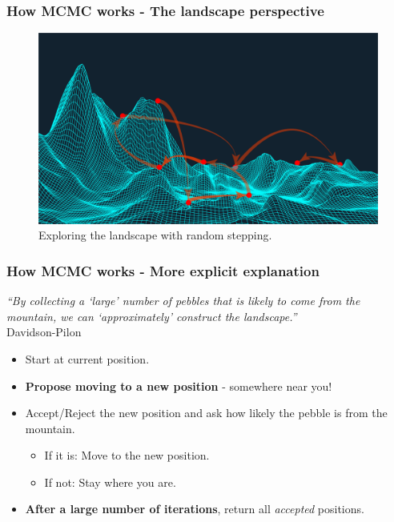 \documentclass[10pt]{beamer}
\begin{document}
\begin{frame}
	\frametitle{How MCMC works - The landscape perspective}
	\begin{figure}[h]
		\centering
		\includegraphics[width=\textwidth]{mountain}
		\caption{Exploring the landscape with random stepping.}
	\end{figure}
\end{frame} 

\begin{frame}
	\frametitle{How MCMC works - More explicit explanation}
	\begin{center}
		\textit{``By collecting a `large' number of pebbles that is likely to come from the mountain, we can `approximately' construct the landscape.''} \\
		\tiny{Davidson-Pilon} \normalsize
	\end{center}
	\begin{itemize}
		\item Start at current position.
		\item \textbf{Propose moving to a new position} - somewhere near you!
		\item Accept/Reject the new position and ask how likely the pebble is from the mountain.
		\begin{itemize}
			\item If it is: Move to the new position.
			\item If not: Stay where you are.
		\end{itemize}
		\item \textbf{After a large number of iterations}, return all \textit{accepted} positions.
	\end{itemize}
\end{frame}
\end{document}
